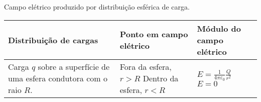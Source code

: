 \begin{quadro}[!htb]
    \centering
    \caption{Campo elétrico produzido por distribuição esférica de carga.\label{qua:quadro-exemplo1}}
    \begin{tabular}{|p{5cm}|p{4.8cm}|p{4.8cm}|}
        \hline
        \textbf{Distribuição de cargas} & \textbf{Ponto em campo elétrico} & \textbf{Módulo do campo elétrico} \\
        \hline
        Carga $q$ sobre a superfície de uma esfera condutora com o raio $R$. & 
        
        Fora da esfera, $r > R$ \newline \newline
        Dentro da esfera, $r < R$ & 
        
        $E = \frac{1}{4\pi\varepsilon_0} \frac{Q}{r^2}$ \newline \newline
        $E = 0$
        \\
        \hline
    \end{tabular}
\end{quadro}